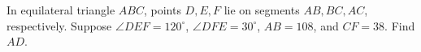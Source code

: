 In equilateral triangle $ABC$, points $D,E,F$ lie on segments $AB,BC,AC$, respectively. Suppose $\angle DEF=120^\circ$, $\angle DFE=30^\circ$, $AB=108$, and $CF=38$. Find $AD$.
